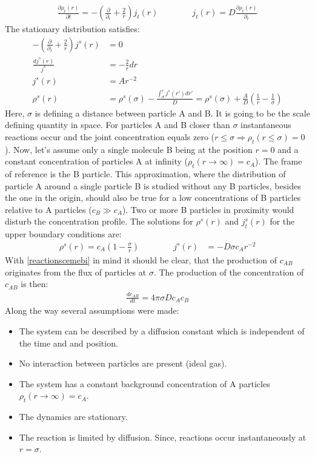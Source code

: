 \documentclass[
  a4paper,BCOR10mm,oneside,
  headsepline,footsepline,%
  fleqn,openbib
]{scrbook}
\begin{document}
\begin{align} \label{smoluchwoskionedimension}
\frac{\partial \rho_t(r)}{\partial t}=-\left(\frac{\partial}{\partial_r}+\frac{2}{r} \right) j_t(r) \qquad \qquad j_t(r)=D \frac{\partial\rho_t(r)}{\partial_r}
\end{align}
 The stationary distribution satisfies:
\begin{align}
 -\left(\frac{\partial}{\partial_r}+\frac{2}{r} \right) j^{s}(r)&= 0\\
 \frac{d j^{s}(r)}{j^{s}}  &=- \frac{2}{r} dr\\
 j^{s}(r)&=A r^{-2}\\
 \rho^s(r)&=\rho^s(\sigma)- \frac{\int_{\sigma}^{r} j^{s}(r')dr'}{D}=\rho^s(\sigma)+\frac{A}{D}\left(\frac{1}{r}-\frac{1}{\sigma}\right)
\end{align}
Here, $\sigma$ is defining a distance between particle A and B. It is going to be the scale defining quantity in space. For particles A and B closer than $\sigma$ instantaneous reactions occur and the joint concentration equals zero ($r\leq \sigma \Rightarrow \rho_t(r \leq \sigma)=0$). Now, let's assume only a single molecule B being at the position $r=0$ and a constant concentration of particles A at infinity ($\rho_t(r \rightarrow \infty)=c_A$). The frame of reference is the B particle. This approximation, where the distribution of particle A around a single particle B is studied without any B particles, besides the one in the origin, should also be true for a low concentrations of B particles relative to A particles ($c_B\gg c_A$). Two or more B particles in proximity would disturb the concentration profile. The solutions for $\rho^{s}(r)$ and $j^{s}_t(r)$ for the upper boundary conditions are:
\begin{align}
 \rho^{s}(r)=c_A \left(1-\frac{\sigma}{r}\right) \qquad \qquad j^{s}(r)&=-D \sigma c_A r^{-2}
 \label{smoluchwoskiproblem}
\end{align}
With \cref{reactionscemebi} in mind it should be clear, that the production of $c_{AB}$ originates from the flux of particles at $\sigma$. The production of the concentration of $c_{AB}$ is then: 
\begin{align}
 \frac{d c_{AB} }{dt}=4 \pi \sigma D c_A c_B \label{difkinetics}
\end{align}
Along the way several assumptions were made:
\begin{itemize}
  \item The system can be described by a diffusion constant which is independent of the time and and position. 
  \item No interaction between particles are present (ideal gas).
  \item The system has a constant background concentration of A particles $\rho_t(r \rightarrow \infty)=c_A$.
  \item The dynamics are stationary.
  \item The reaction is limited by diffusion. Since, reactions occur instantaneously at $r=\sigma$. 
\end{itemize}
\end{document}
